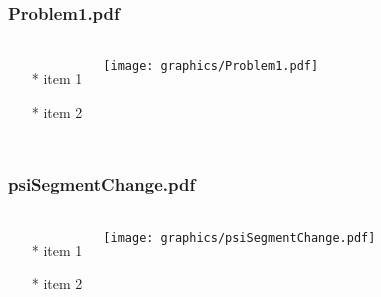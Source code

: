 \begin{frame} \frametitle{Problem1.pdf}
    \begin{columns}[c]
        \begin{itemize}
            \item[*] item 1
            \item[*] item 2
        \end{itemize}
        \begin{minipage}{\linewidth}
            \begin{center}
            \texttt{[image: graphics/Problem1.pdf]}
            \label{gfx:Problem1.pdf}
            \end{center}
        \end{minipage}
    \end{columns}
\end{frame}
\begin{frame} \frametitle{psiSegmentChange.pdf}
    \begin{columns}[c]
        \begin{itemize}
            \item[*] item 1
            \item[*] item 2
        \end{itemize}
        \begin{minipage}{\linewidth}
            \begin{center}
            \texttt{[image: graphics/psiSegmentChange.pdf]}
            \label{gfx:psiSegmentChange.pdf}
            \end{center}
        \end{minipage}
    \end{columns}
\end{frame}
